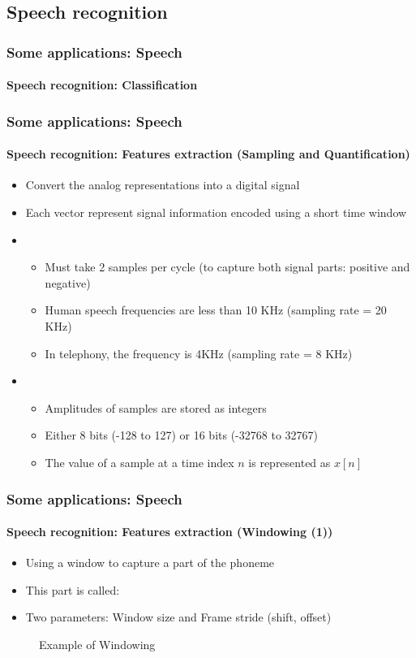 \documentclass[xcolor=table]{beamer}
\begin{document}
\subsection{Speech recognition}

\begin{frame}
	\frametitle{Some applications: Speech}
	\framesubtitle{Speech recognition: Classification}
\end{frame}


\begin{frame}
	\frametitle{Some applications: Speech}
	\framesubtitle{Speech recognition: Features extraction (Sampling and Quantification)}
	\begin{itemize}
		\item Convert the analog representations into a digital signal
		\item Each vector represent signal information encoded using a short time window
		\item {}
		\begin{itemize}
			\item Must take 2 samples per cycle (to capture both signal parts: positive and negative)
			\item Human speech frequencies are less than 10 KHz (sampling rate = 20 KHz)
			\item In telephony, the frequency is 4KHz (sampling rate = 8 KHz)
		\end{itemize}
		\item {}
		\begin{itemize}
			\item Amplitudes of samples are stored as integers
			\item Either 8 bits (-128 to 127) or 16 bits (-32768 to 32767)
			\item The value of a sample at a time index $n$ is represented as $x[n]$
		\end{itemize}
	\end{itemize}
\end{frame}

\begin{frame}
	\frametitle{Some applications: Speech}
	\framesubtitle{Speech recognition: Features extraction (Windowing (1))}
	
	\begin{itemize}
		\item Using a window to capture a part of the phoneme
		\item This part is called: 
		\item Two parameters: Window size and Frame stride (shift, offset)
	\end{itemize}

	\begin{figure}
		\centering
		\caption{Example of Windowing \cite{2020-jurafsky-martin}}
	\end{figure}
\end{frame}
\end{document}
